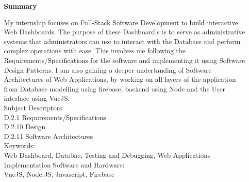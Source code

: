 \begin{center}
	\Large\textbf{Summary}
\end{center}
\noindent
My internship focuses on Full-Stack Software Development to build interactive Web Dashboards.
The purpose of these Dashboard's is to serve as administrative systems that administrators can use to interact
with the Database and perform complex operations with ease.
This involves me following the Requirements/Specifications for the software and implementing it using Software Design Patterns.
I am also gaining a deeper undertanding of Software Architectures of Web Applications, by working on all layers of the application from
Database modelling using firebase, backend using Node and the User interface using VueJS.
\\

\noindent
Subject Descriptors:\\
\indent D.2.1  Requirements/Specifications\\
\indent D.2.10 Design\\
\indent D.2.11 Software Architectures\\

\noindent
Keywords:\\
\indent Web Dashboard, Databae, Testing and Debugging, Web Applications\\

\noindent
Implementation Software and Hardware:\\
\indent VueJS, Node.JS, Javascript, Firebase